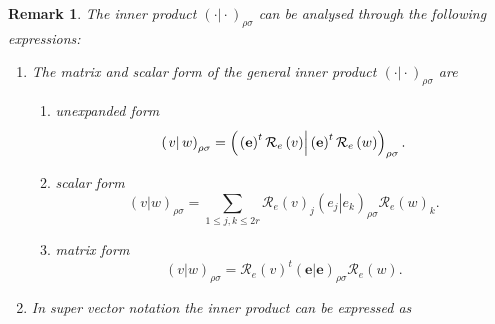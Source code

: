 \documentclass[aps,preprint]{revtex4}
\newtheorem{remark}[theorem]{Remark}
\begin{document}
\begin{remark}
The inner product $\left( \left. \cdot \right\vert \cdot \right) _{\rho
\sigma }$ can be analysed through the following expressions:

\begin{enumerate}
\item The matrix and scalar form of the general inner product $\left( \left.
\cdot \right\vert \cdot \right) _{\rho \sigma }$ are

\begin{enumerate}
\item unexpanded form%
\begin{equation}
\left( \left. v\right\vert w\right) _{\rho \sigma }=\left( \left. \overset{}{%
\left( \mathbf{e}\right) ^{t}\mathcal{R}_{e}\left( v\right) }\right\vert
\left( \mathbf{e}\right) ^{t}\mathcal{R}_{e}\left( w\right) \right) _{\rho
\sigma }.
\end{equation}

\item scalar form%
\begin{equation}
\left( \left. v\right\vert w\right) _{\rho \sigma }=\sum_{1\leq j,k\leq 2r}%
\mathcal{R}_{e}\left( v\right) _{j}\left( \left. e_{j}\right\vert
e_{k}\right) _{\rho \sigma }\mathcal{R}_{e}\left( w\right) _{k}.
\end{equation}

\item matrix form%
\begin{equation}
\left( \left. v\right\vert w\right) _{\rho \sigma }=\mathcal{R}_{e}\left(
v\right) ^{t}\left( \left. \mathbf{e}\right\vert \mathbf{e}\right) _{\rho
\sigma }\mathcal{R}_{e}\left( w\right) .
\end{equation}
\end{enumerate}

\item In super vector notation the inner product can be expressed as


\end{enumerate}
\end{remark}
\end{document}

